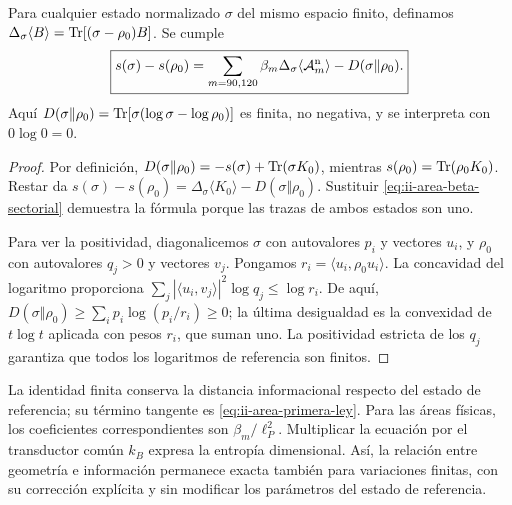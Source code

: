 \begin{theorem}
\label{thm:ii-area-ley-finita}
Para cualquier estado normalizado \(\sigma\) del mismo espacio finito,
definamos \(\Delta_\sigma\langle B\rangle
=\operatorname{Tr}[(\sigma-\rho_0)B]\). Se cumple
\begin{equation}
 \boxed{
 s(\sigma)-s(\rho_0)
 =\sum_{m=90,120}\beta_m
      \Delta_\sigma\langle\mathcal A_m^{\rm n}\rangle
   -D(\sigma\Vert\rho_0).}
 \label{eq:ii-area-ley-finita}
\end{equation}
Aquí \(D(\sigma\Vert\rho_0)=\operatorname{Tr}[\sigma(\log\sigma-\log\rho_0)]\)
es finita, no negativa, y se interpreta con \(0\log0=0\).
\end{theorem}
\begin{proof}
Por definición,
\(D(\sigma\Vert\rho_0)=-s(\sigma)+\operatorname{Tr}(\sigma K_0)\), mientras
\(s(\rho_0)=\operatorname{Tr}(\rho_0K_0)\). Restar da
\(s(\sigma)-s(\rho_0)=\Delta_\sigma\langle K_0\rangle
-D(\sigma\Vert\rho_0)\). Sustituir
\eqref{eq:ii-area-beta-sectorial} demuestra la fórmula porque las
trazas de ambos estados son uno.

Para ver la positividad, diagonalicemos \(\sigma\) con autovalores
\(p_i\) y vectores \(u_i\), y \(\rho_0\) con autovalores
\(q_j>0\) y vectores \(v_j\). Pongamos
\(r_i=\langle u_i,\rho_0u_i\rangle\). La concavidad del logaritmo
proporciona
\(\sum_j|\langle u_i,v_j\rangle|^2\log q_j\le\log r_i\).
De aquí,
\(D(\sigma\Vert\rho_0)\ge\sum_i p_i\log(p_i/r_i)\ge0\);
la última desigualdad es la convexidad de \(t\log t\) aplicada
con pesos \(r_i\), que suman uno. La positividad estricta de los
\(q_j\) garantiza que todos los logaritmos de referencia son finitos.
\end{proof}

La identidad finita conserva la distancia informacional respecto del
estado de referencia; su término tangente es
\eqref{eq:ii-area-primera-ley}. Para las áreas físicas, los
coeficientes correspondientes son \(\beta_m/\ell_P^2\).
Multiplicar la ecuación por el transductor común \(k_B\) expresa
la entropía dimensional. Así, la relación entre geometría e información
permanece exacta también para variaciones finitas, con su corrección
explícita y sin modificar los parámetros del estado de referencia.
